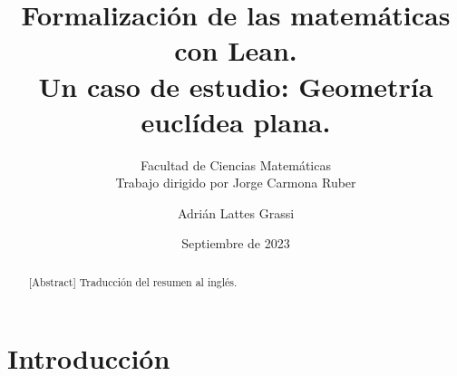 \documentclass[11pt, spanish]{TFG}
\title{Formalización de las matemáticas con Lean.\\ Un caso de estudio: Geometría euclídea plana.}
\date{Septiembre de 2023}
\author{Adrián Lattes Grassi}
\subtitle{Facultad de Ciencias Matemáticas\\Trabajo dirigido por Jorge Carmona Ruber}
\begin{document}
\maketitle
\emptypage

\begin{abstract}
    \lipsum[3]
\end{abstract}

\begin{abstract}[Abstract]
    Traducción del resumen al inglés.
    \lipsum[2]
\end{abstract}
\newpage

\tableofcontents
\newpage


\section*{Introducción}

\end{document}
